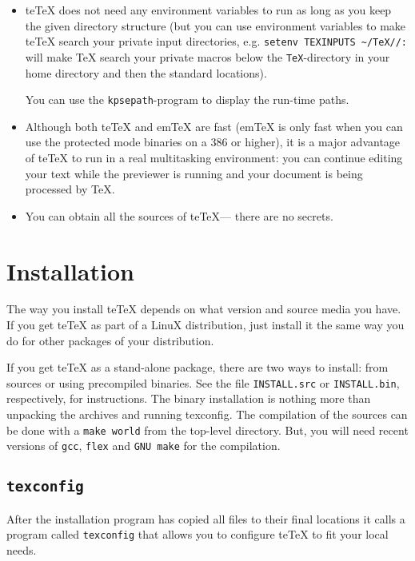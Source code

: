 \documentclass[12pt,a4paper]{article}
\newcommand{\teTeX}{\textrm{te}\TeX\xspace}
\newcommand{\Linux}{\textrm{Linu}\textsf{X}\xspace}
\begin{document}
\begin{itemize}
  
\item \teTeX{} does not need any environment variables to
  run as long as you keep the given directory structure (but
  you can use environment variables to make \teTeX{} search
  your private input directories, e.g. {\tt setenv TEXINPUTS
    \~{}/TeX//:} will make \TeX{} search your private macros
  below the {\tt TeX}-directory in your home directory and
  then the standard locations).
  
  You can use the {\tt kpsepath}-program to display the
  run-time paths.
  
\item Although both \teTeX and em\TeX{} are fast (em\TeX{} is
  only fast when you can use the protected mode binaries on
  a 386 or higher), it is a major advantage of \teTeX to run
  in a real multitasking environment: you can continue
  editing your text while the previewer is running and your
  document is being processed by \TeX{}.

\item You can obtain all the sources of \teTeX --- there are no secrets.
\end{itemize}

\section{Installation}
\label{sec:ins}

The way you install \teTeX depends on what version and
source media you have. If you get \teTeX as part of a \Linux
distribution, just install it the same way you do for other
packages of your distribution.

If you get \teTeX as a stand-alone package, there are two ways to
install: from sources or using precompiled binaries. See the file 
{\tt INSTALL.src} or {\tt INSTALL.bin}, respectively, for
instructions. The binary installation is nothing more than unpacking
the archives and running texconfig. The compilation of the sources can
be done with a {\tt make world} from the top-level directory. But, you
will need recent versions of {\tt gcc}, {\tt flex} and {\tt GNU make}
for the compilation.

\subsection{{\tt texconfig}}
\label{ssec:tex}

After the installation program has copied all files to their
final locations it calls a program called {\tt texconfig}
that allows you to configure \teTeX{} to fit your local
needs.
\end{document}
